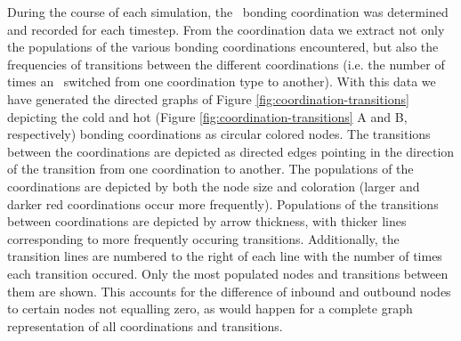 During the course of each simulation, the \suldiox~bonding coordination was determined and recorded for each timestep. From the coordination data we extract not only the populations of the various bonding coordinations encountered, but also the frequencies of transitions between the different coordinations (i.e. the number of times an \suldiox~switched from one coordination type to another). With this data we have generated the directed graphs of Figure \ref{fig:coordination-transitions} depicting the cold and hot (Figure \ref{fig:coordination-transitions} A and B, respectively) bonding coordinations as circular colored nodes.\cite{Ellson2004,Gansner1999} The transitions between the coordinations are depicted as directed edges pointing in the direction of the transition from one coordination to another. The populations of the coordinations are depicted by both the node size and coloration (larger and darker red coordinations occur more frequently). Populations of the transitions between coordinations are depicted by arrow thickness, with thicker lines corresponding to more frequently occuring transitions. Additionally, the transition lines are numbered to the right of each line with the number of times each transition occured. Only the most populated nodes and transitions between them are shown. This accounts for the difference of inbound and outbound nodes to certain nodes not equalling zero, as would happen for a complete graph representation of all coordinations and transitions.

